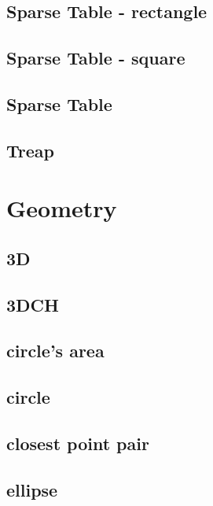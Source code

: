 \documentclass[a4paper,5pt,twocolumn,titlepage]{article}
\begin{document}
\subsection{Sparse Table - rectangle}

\subsection{Sparse Table - square}

\subsection{Sparse Table}

\subsection{Treap}


\section{Geometry}
\subsection{3D}

\subsection{3DCH}

\subsection{circle's area}

\subsection{circle}

\subsection{closest point pair}

\subsection{ellipse}

\end{document}
